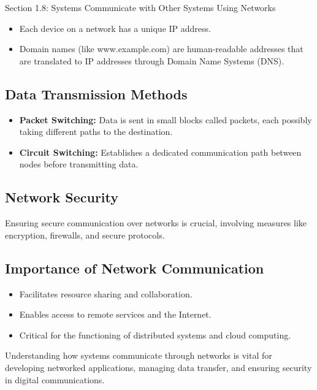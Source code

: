 \begin{notes}{Section 1.8: Systems Communicate with Other Systems Using Networks}
    \begin{itemize}
        \item Each device on a network has a unique IP address.
        \item Domain names (like www.example.com) are human-readable addresses that are translated to IP addresses through Domain Name Systems (DNS).
    \end{itemize}
    
    \subsection*{Data Transmission Methods}

    \begin{itemize}
        \item \textbf{Packet Switching:} Data is sent in small blocks called packets, each possibly taking different paths to the destination.
        \item \textbf{Circuit Switching:} Establishes a dedicated communication path between nodes before transmitting data.
    \end{itemize}
    
    \subsection*{Network Security}

    Ensuring secure communication over networks is crucial, involving measures like encryption, firewalls, and secure protocols.
    
    \subsection*{Importance of Network Communication}

    \begin{itemize}
        \item Facilitates resource sharing and collaboration.
        \item Enables access to remote services and the Internet.
        \item Critical for the functioning of distributed systems and cloud computing.
    \end{itemize}
    
    Understanding how systems communicate through networks is vital for developing networked applications, managing data transfer, and ensuring security in digital communications.    
\end{notes}

